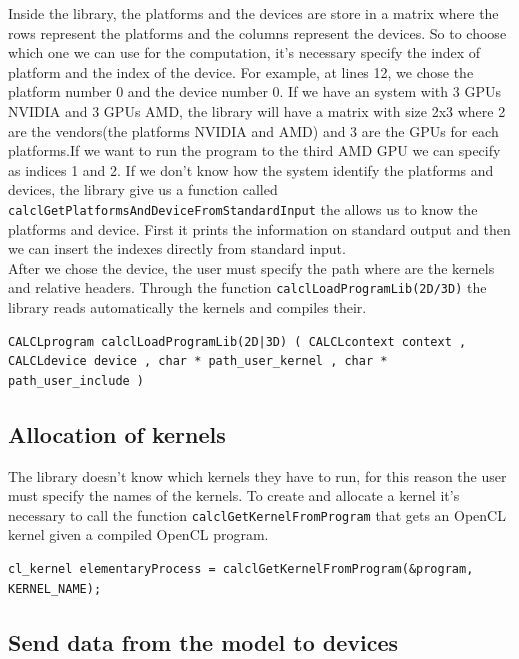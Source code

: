 Inside the library, the platforms and the devices are store in a matrix where the
rows represent the platforms and the columns represent the devices. So to choose which one we can use for the computation,
it's necessary specify the index of platform and the index of the device. For
example, at lines 12, we chose the platform number
0 and the device number 0. If we have an system with 3 GPUs NVIDIA and 3 GPUs
AMD, the library will have a matrix with size 2x3 where 2 are the
vendors(the platforms NVIDIA and AMD) and 3 are the GPUs for each platforms.If we want to 	
run the program to the third AMD GPU we can specify as indices 1 and 2.
If we don't know how the system identify the platforms and devices, the
library give us a function called \verb'calclGetPlatformsAndDeviceFromStandardInput'
the allows us to know the platforms and device. First it prints the
information on standard output and then we can insert the indexes directly from
standard input.\\
After we chose the device, the user must specify the path where are the kernels
and relative headers.
Through the function \verb'calclLoadProgramLib(2D/3D)' the library reads automatically
the kernels and compiles their.
\begin{lstlisting}
CALCLprogram calclLoadProgramLib(2D|3D) ( CALCLcontext context ,
CALCLdevice device , char * path_user_kernel , char *
path_user_include )
\end{lstlisting}

\subsection{Allocation of kernels}

The library doesn't know which kernels they have to run, for this reason the
user must specify the names of the kernels.
To create and allocate a kernel it's necessary to call the function
\verb'calclGetKernelFromProgram' that gets an OpenCL kernel given a compiled OpenCL
program. 

\begin{lstlisting}
cl_kernel elementaryProcess = calclGetKernelFromProgram(&program,
KERNEL_NAME);
\end{lstlisting}


\subsection{Send data from the model to devices}


